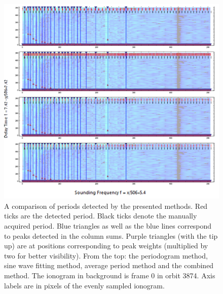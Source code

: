 \begin{figure}
	\centering
	\includegraphics[width=140mm]{images/detected_period_fitting_periodogram_quantile_orbit_3874_000.png}
	\caption{A comparison of periods detected by the presented methods. Red ticks are the detected period. Black ticks denote the manually acquired period. Blue triangles as well as the blue lines correspond to peaks detected in the column sums. Purple triangles (with the tip up) are at positions corresponding to peak weights (multiplied by two for better visibility). From the top: the periodogram method, sine wave fitting method, average period method and the combined method. The ionogram in background is frame 0 in orbit 3874. Axis labels are in pixels of the evenly sampled ionogram. }
	\label{fig:sums_comparison}
\end{figure}